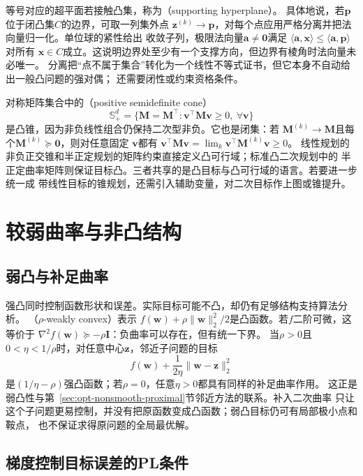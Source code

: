 等号对应的超平面若接触凸集，称为（supporting hyperplane）。
具体地说，若$\bm{p}$位于闭凸集$C$的边界，可取一列集外点
$\bm{z}^{(k)}\to\bm{p}$，对每个点应用严格分离并把法向量归一化。单位球的紧性给出
收敛子列，极限法向量$\bm{a}\neq\bm{0}$满足
$\langle\bm{a},\bm{x}\rangle\leq\langle\bm{a},\bm{p}\rangle$对所有
$\bm{x}\in C$成立。这说明边界处至少有一个支撑方向，但边界有棱角时法向量未必唯一。
分离把“点不属于集合”转化为一个线性不等式证书，但它本身不自动给出一般凸问题的强对偶；
还需要闭性或约束资格条件。

对称矩阵集合中的（positive semidefinite cone）
\[
  \mathbb{S}_+^d=\{\bm{M}=\bm{M}^{\top}:
  \bm{v}^{\top}\bm{M}\bm{v}\geq0,\ \forall\bm{v}\}
\]
是凸锥，因为非负线性组合仍保持二次型非负。它也是闭集：若
$\bm{M}^{(k)}\to\bm{M}$且每个$\bm{M}^{(k)}\succeq\bm{0}$，则对任意固定
$\bm{v}$都有
$\bm{v}^{\top}\bm{M}\bm{v}
=\lim_k\bm{v}^{\top}\bm{M}^{(k)}\bm{v}\geq0$。
线性规划的非负正交锥和半正定规划的矩阵约束直接定义凸可行域；标准凸二次规划中的
半正定曲率矩阵则保证目标凸。三者共享的是凸目标与凸可行域的语言。若要进一步统一成
带线性目标的锥规划，还需引入辅助变量，对二次目标作上图或锥提升。

\section{较弱曲率与非凸结构}
\label{sec:opt-weaker-curvature}

\subsection{弱凸与补足曲率}

强凸同时控制函数形状和误差。实际目标可能不凸，却仍有足够结构支持算法分析。
（$\rho$-weakly convex）表示
$f(\bm{w})+\rho\lVert\bm{w}\rVert_2^2/2$是凸函数。若$f$二阶可微，这等价于
$\nabla^2f(\bm{w})\succeq-\rho\bm{I}$：负曲率可以存在，但有统一下界。
当$\rho>0$且$0<\eta<1/\rho$时，对任意中心$\bm{z}$，邻近子问题的目标
\[
  f(\bm{w})+\frac{1}{2\eta}\lVert\bm{w}-\bm{z}\rVert_2^2
\]
是$(1/\eta-\rho)$强凸函数；若$\rho=0$，任意$\eta>0$都具有同样的补足曲率作用。
这正是弱凸性与第~\ref{sec:opt-nonsmooth-proximal}节邻近方法的联系。补入二次曲率
只让这个子问题更易控制，并没有把原函数变成凸函数；弱凸目标仍可有局部极小点和鞍点，
也不保证求得原问题的全局最优解。

\subsection{梯度控制目标误差的PL条件}

